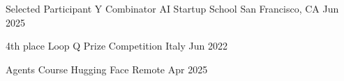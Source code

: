 



\begin{cvhonors}
  \cvhonor
    {Selected Participant} %
    {Y Combinator AI Startup School} %
    {San Francisco, CA} %
    {Jun 2025} %

  \cvhonor
    {4th place} %
    {Loop Q Prize Competition} %
    {Italy} %
    {Jun 2022} %
\end{cvhonors}


\begin{cvhonors}
  \cvhonor
    {Agents Course} %
    {Hugging Face} %
    {Remote} %
    {Apr 2025} %
\end{cvhonors}